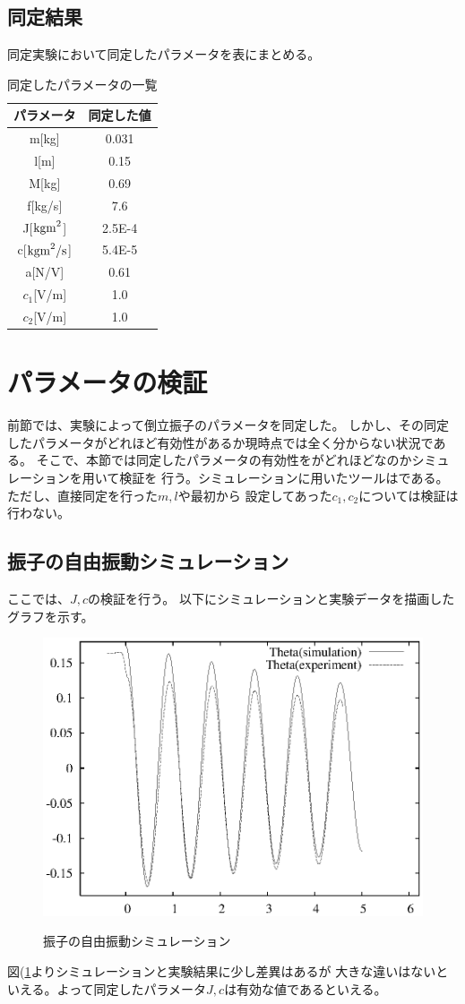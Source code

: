\subsection{同定結果}
	同定実験において同定したパラメータを表にまとめる。
	\begin{table}[htb]
		\begin{center}
			\caption{同定したパラメータの一覧}
			\medskip
			
			\begin{tabular}{|c|c|}\hline
				パラメータ & 同定した値 \\ \hline\hline
				m[kg]  & 0.031\\ \hline
				l[m] & 0.15\\ \hline
				M[kg] & 0.69\\ \hline
				f[kg/s] & 7.6\\ \hline
				J[$\rm{kgm}^{2}$] & 2.5E-4\\ \hline
				c[$\rm{kgm}^{2}/\rm{s}$] & 5.4E-5\\ \hline
				a[N/V] & 0.61\\ \hline
				$c_{1}$[V/m] & 1.0\\ \hline
				$c_{2}$[V/m] & 1.0\\ \hline
			\end{tabular}
		\end{center}
	\end{table}
	
\section{パラメータの検証}
	前節では、実験によって倒立振子のパラメータを同定した。
	しかし、その同定したパラメータがどれほど有効性があるか現時点では全く分からない状況である。
	そこで、本節では同定したパラメータの有効性をがどれほどなのかシミュレーションを用いて検証を
	行う。シミュレーションに用いたツールは\MaTX{}である。ただし、直接同定を行った$m,l$や最初から
	設定してあった$c_1,c_2$については検証は行わない。
	\subsection{振子の自由振動シミュレーション}
		ここでは、$J,c$の検証を行う。
		以下にシミュレーションと実験データを描画したグラフを示す。
		\begin{figure}[H]
			\centering
			\includegraphics[width=0.5\linewidth]{gazo/free45Auto.eps}\\
			\caption{振子の自由振動シミュレーション}
			\label{image:freependulum}
		\end{figure}
		図(\ref{image:freependulum}よりシミュレーションと実験結果に少し差異はあるが
		大きな違いはないといえる。よって同定したパラメータ$J,c$は有効な値であるといえる。
